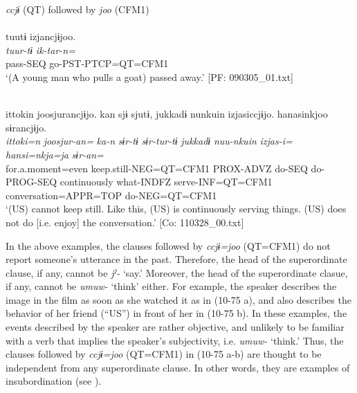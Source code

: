 \ea\label{ex:10.75}   \textit{ccjɨ} (QT) followed by \textit{joo} (CFM1)\\
  \ea{}\\
      \glll    tuutɨ  izjancjɨjoo.\\
      \textit{tuur-tɨ}  \textit{ik-tar-n=}\\
      pass-SEQ  go-PST-PTCP=QT=CFM1\\
      \glt       ‘(A young man who pulls a goat) passed away.’ [PF: 090305\_01.txt]

  \ex{}\\
      \glll    {\textbar}ittoki{\textbar}n  joosjurancjɨjo.  kan  sjɨ   sjutɨ,  jukkadɨ  nunkuin  izjasiccjɨjo. hanasinkjoo  sɨrancjɨjo.\\
      \textit{ittoki=n}  \textit{joosjur-an=}  \textit{ka-n}  \textit{sɨr-tɨ}  \textit{sɨr-tur-tɨ}  \textit{jukkadɨ}  \textit{nuu-nkuin}  \textit{izjas-i=} \textit{hansi=nkja=ja}  \textit{sɨr-an=}\\
      for.a.moment=even  keep.still-NEG=QT=CFM1  PROX-ADVZ  do-SEQ  do-PROG-SEQ  continuously  what-INDFZ  serve-INF=QT=CFM1   conversation=APPR=TOP  do-NEG=QT=CFM1\\      
      \glt ‘(US) cannot keep still. Like this, (US) is continuously serving things. (US) does not do [i.e. enjoy] the conversation.’   [Co: 110328\_00.txt]
    \z
\z

In the above examples, the clauses followed by \textit{ccjɨ=joo} (QT=CFM1) do not report someone’s utterance in the past. Therefore, the head of the superordinate clause, if any, cannot be \textit{jˀ-} ‘say.’ Moreover, the head of the superordinate clasue, if any, cannot be \textit{umuw-} ‘think’ either. For example, the speaker describes the image in the film as soon as she watched it as in (10-75 a), and also describes the behavior of her friend (“US”) in front of her in (10-75 b). In these examples, the events described by the speaker are rather objective, and unlikely to be familiar with a verb that implies the speaker’s subjectivity, i.e. \textit{umuw-} ‘think.’ Thus, the clauses followed by \textit{ccjɨ=joo} (QT=CFM1) in (10-75 a-b) are thought to be independent from any superordinate clause. In other words, they are examples of insubordination (see ).

